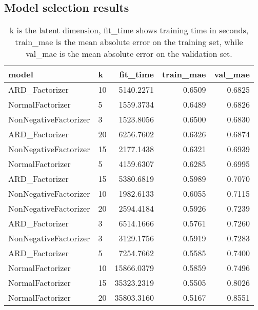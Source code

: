 \documentclass[12pt]{article}
\begin{document}
    \subsection{Model selection results}
    \begin{table}[H]
        \centering
        \caption{k is the latent dimension, fit\_time shows training time in seconds, train\_mae is the mean absolute error on the training set, while val\_mae is the mean absolute error on the validation set.}
        \begin{tabular}{llrrr}
            \toprule
                             model &   k &   fit\_time &  train\_mae &  val\_mae \\
            \midrule
                    ARD\_Factorizer &  10 &  5140.2271 &     0.6509 &   0.6825 \\
                  NormalFactorizer &   5 &  1559.3734 &     0.6489 &   0.6826 \\
             NonNegativeFactorizer &   3 &  1523.8056 &     0.6500 &   0.6830 \\
                    ARD\_Factorizer &  20 &  6256.7602 &     0.6326 &   0.6874 \\
             NonNegativeFactorizer &  15 &  2177.1438 &     0.6321 &   0.6939 \\
                  NormalFactorizer &   5 &  4159.6307 &     0.6285 &   0.6995 \\
                    ARD\_Factorizer &  15 &  5380.6819 &     0.5989 &   0.7070 \\
             NonNegativeFactorizer &  10 &  1982.6133 &     0.6055 &   0.7115 \\
             NonNegativeFactorizer &  20 &  2594.4184 &     0.5926 &   0.7239 \\
                    ARD\_Factorizer &   3 &  6514.1666 &     0.5761 &   0.7260 \\
             NonNegativeFactorizer &   3 &  3129.1756 &     0.5919 &   0.7283 \\
                    ARD\_Factorizer &   5 &  7254.7662 &     0.5585 &   0.7400 \\
                  NormalFactorizer &  10 & 15866.0379 &     0.5859 &   0.7496 \\
                  NormalFactorizer &  15 & 35323.2319 &     0.5505 &   0.8026 \\
                  NormalFactorizer &  20 & 35803.3160 &     0.5167 &   0.8551 \\
            \bottomrule
        \end{tabular}
    \end{table}

% 


\end{document}
